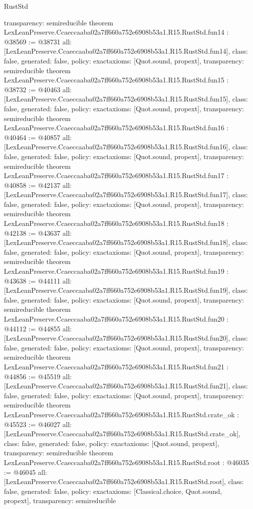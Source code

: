 \begin{lexlean}{RustStd}
\begin{coremodule}
{  transparency: semireducible
}
theorem LexLeanPreserve.Ccaeccaaba02a7ff660a752e6908b53a1.R15.RustStd.fun14 : @38569 := @38731 {
  all: [LexLeanPreserve.Ccaeccaaba02a7ff660a752e6908b53a1.R15.RustStd.fun14],
  class: false,
  generated: false,
  policy: exact{axioms: [Quot.sound, propext]},
  transparency: semireducible
}
theorem LexLeanPreserve.Ccaeccaaba02a7ff660a752e6908b53a1.R15.RustStd.fun15 : @38732 := @40463 {
  all: [LexLeanPreserve.Ccaeccaaba02a7ff660a752e6908b53a1.R15.RustStd.fun15],
  class: false,
  generated: false,
  policy: exact{axioms: [Quot.sound, propext]},
  transparency: semireducible
}
theorem LexLeanPreserve.Ccaeccaaba02a7ff660a752e6908b53a1.R15.RustStd.fun16 : @40464 := @40857 {
  all: [LexLeanPreserve.Ccaeccaaba02a7ff660a752e6908b53a1.R15.RustStd.fun16],
  class: false,
  generated: false,
  policy: exact{axioms: [Quot.sound, propext]},
  transparency: semireducible
}
theorem LexLeanPreserve.Ccaeccaaba02a7ff660a752e6908b53a1.R15.RustStd.fun17 : @40858 := @42137 {
  all: [LexLeanPreserve.Ccaeccaaba02a7ff660a752e6908b53a1.R15.RustStd.fun17],
  class: false,
  generated: false,
  policy: exact{axioms: [Quot.sound, propext]},
  transparency: semireducible
}
theorem LexLeanPreserve.Ccaeccaaba02a7ff660a752e6908b53a1.R15.RustStd.fun18 : @42138 := @43637 {
  all: [LexLeanPreserve.Ccaeccaaba02a7ff660a752e6908b53a1.R15.RustStd.fun18],
  class: false,
  generated: false,
  policy: exact{axioms: [Quot.sound, propext]},
  transparency: semireducible
}
theorem LexLeanPreserve.Ccaeccaaba02a7ff660a752e6908b53a1.R15.RustStd.fun19 : @43638 := @44111 {
  all: [LexLeanPreserve.Ccaeccaaba02a7ff660a752e6908b53a1.R15.RustStd.fun19],
  class: false,
  generated: false,
  policy: exact{axioms: [Quot.sound, propext]},
  transparency: semireducible
}
theorem LexLeanPreserve.Ccaeccaaba02a7ff660a752e6908b53a1.R15.RustStd.fun20 : @44112 := @44855 {
  all: [LexLeanPreserve.Ccaeccaaba02a7ff660a752e6908b53a1.R15.RustStd.fun20],
  class: false,
  generated: false,
  policy: exact{axioms: [Quot.sound, propext]},
  transparency: semireducible
}
theorem LexLeanPreserve.Ccaeccaaba02a7ff660a752e6908b53a1.R15.RustStd.fun21 : @44856 := @45519 {
  all: [LexLeanPreserve.Ccaeccaaba02a7ff660a752e6908b53a1.R15.RustStd.fun21],
  class: false,
  generated: false,
  policy: exact{axioms: [Quot.sound, propext]},
  transparency: semireducible
}
theorem LexLeanPreserve.Ccaeccaaba02a7ff660a752e6908b53a1.R15.RustStd.crate_ok : @45523 := @46027 {
  all: [LexLeanPreserve.Ccaeccaaba02a7ff660a752e6908b53a1.R15.RustStd.crate_ok],
  class: false,
  generated: false,
  policy: exact{axioms: [Quot.sound, propext]},
  transparency: semireducible
}
theorem LexLeanPreserve.Ccaeccaaba02a7ff660a752e6908b53a1.R15.RustStd.root : @46035 := @46045 {
  all: [LexLeanPreserve.Ccaeccaaba02a7ff660a752e6908b53a1.R15.RustStd.root],
  class: false,
  generated: false,
  policy: exact{axioms: [Classical.choice, Quot.sound, propext]},
  transparency: semireducible
}


\end{coremodule}
\end{lexlean}

